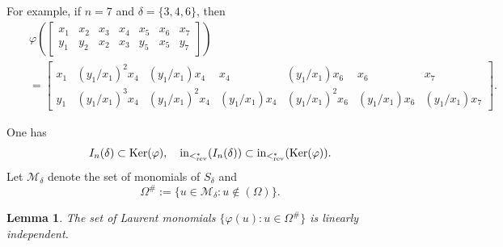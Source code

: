 \documentclass[12pt]{amsart}
\def\Mc{{\mathcal M}}
\newtheorem{Lemma}[Theorem]{Lemma}
\begin{document}
For example, if $n=7$ and $\delta=\{3,4,6\}$, then
\begin{eqnarray*}
&&\varphi\left(
\begin{bmatrix}
   x_1 & x_2 & x_3 & x_4 & x_5 & x_6 & x_7 \\
   y_1 & y_2 & x_2 & x_3 & y_5 & x_5 & y_7  
\end{bmatrix}
\right) \\
&&=
\begin{bmatrix}
   x_1 & (y_1/x_1)^2x_4 & (y_1/x_1)x_4 & x_4 & (y_1/x_1)x_6 & x_6 & x_7 \\   y_1 & (y_1/x_1)^3x_4 & (y_1/x_1)^2x_4 & (y_1/x_1)x_4 & (y_1/x_1)^2x_6 & (y_1/x_1)x_6 & (y_1/x_1)x_7  
\end{bmatrix}.
\end{eqnarray*}




One has 
\[
I_n(\delta) \subset {\rm Ker}(\varphi), \quad {\rm in}_{<_{\rm rev}^*}(I_n(\delta)) \subset {\rm in}_{<_{\rm rev}^*}({\rm Ker}(\varphi)).
\]
Let $\Mc_\delta$ denote the set of monomials of $S_\delta$ and 
\[
\Omega^\# := \{u \in \Mc_\delta : u \not\in (\Omega)\}.
\]
\begin{Lemma}
    \label{linear_independent}
The set of Laurent monomials $\{\varphi(u) : u \in \Omega^\# \}$ is linearly independent. 
\end{Lemma}
\end{document}
